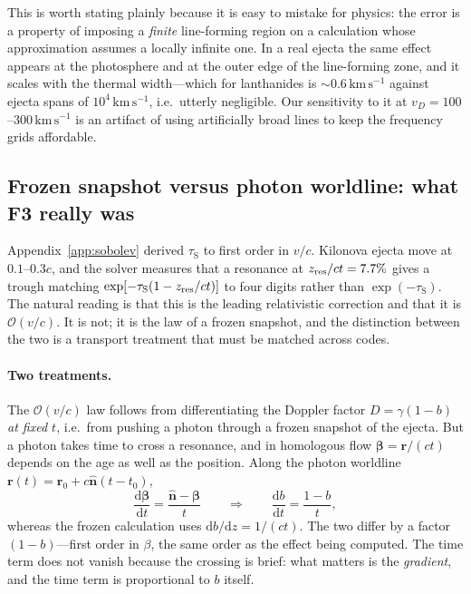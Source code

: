 \documentclass[fleqn,usenatbib]{mnras}
\newcommand{\taus}{\tau_{\mathrm{S}}}
\newcommand{\kms}{\,\mathrm{km\,s^{-1}}}
\begin{document}
This is worth stating plainly because it is easy to mistake for physics: the
error is a property of imposing a \emph{finite} line-forming region on a
calculation whose approximation assumes a locally infinite one. In a real
ejecta the same effect appears at the photosphere and at the outer edge of the
line-forming zone, and it scales with the thermal width---which for
lanthanides is $\sim0.6\kms$ against ejecta spans of $10^4\kms$, i.e.\ utterly
negligible. Our sensitivity to it at $v_D = 100$--$300\kms$ is an artifact of
using artificially broad lines to keep the frequency grids affordable.

\subsection{Frozen snapshot versus photon worldline: what F3 really was}
\label{app:frame}

Appendix~\ref{app:sobolev} derived $\taus$ to first order in $v/c$. Kilonova
ejecta move at $0.1$--$0.3c$, and the solver measures that a resonance at
$z_{\rm res}/ct = 7.7\%$ gives a trough matching
$\exp[-\taus(1-z_{\rm res}/ct)]$ to four digits rather than $\exp(-\taus)$.
The natural reading is that this is the leading relativistic correction and
that it is $\mathcal{O}(v/c)$. It is not; it is the law of a frozen snapshot,
and the distinction between the two is a transport treatment that must be
matched across codes.

\paragraph{Two treatments.} The $\mathcal{O}(v/c)$ law follows from
differentiating the Doppler factor $D = \gamma(1-b)$ \emph{at fixed $t$},
i.e.\ from pushing a photon through a frozen snapshot of the ejecta. But a photon takes time to cross a resonance,
and in homologous flow $\boldsymbol\beta = \mathbf r/(ct)$ depends on the age
as well as the position. Along the photon worldline
$\mathbf r(t) = \mathbf r_0 + c\hat{\mathbf n}(t-t_0)$,
\begin{equation}
  \frac{\mathrm{d}\boldsymbol\beta}{\mathrm{d}t}
  = \frac{\hat{\mathbf n} - \boldsymbol\beta}{t}
  \qquad\Longrightarrow\qquad
  \frac{\mathrm{d}b}{\mathrm{d}t} = \frac{1-b}{t},
\end{equation}
whereas the frozen calculation uses $\mathrm{d}b/\mathrm{d}z = 1/(ct)$. The
two differ by a factor $(1-b)$---first order in $\beta$, the same order as the
effect being computed. The time term does not vanish because the crossing is
brief: what matters is the \emph{gradient}, and the time term is proportional
to $b$ itself.
\end{document}
